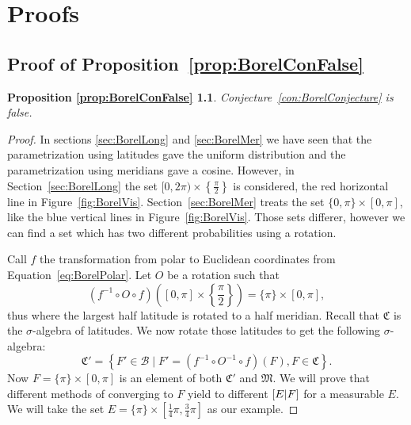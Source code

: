 \documentclass[a4paper]{report}
\theoremstyle{plain}
\newtheorem*{propositionBorelConFalse}{Proposition \ref{prop:BorelConFalse}}
\theoremstyle{definition}
\theoremstyle{remark}
\numberwithin{equation}{chapter}
\let\P\relax
\DeclareMathOperator{\P}{\mathbb{P}}
\DeclareMathOperator{\1}{\mathbbm{1}}
\newcommand{\B}{\mathcal{B}}
\begin{document}
\chapter{Proofs}
\section{Proof of Proposition~\ref{prop:BorelConFalse}}\label{app:ProofBorelConFalse}
\begin{propositionBorelConFalse}
Conjecture~\ref{con:BorelConjecture} is false.
\end{propositionBorelConFalse}
\begin{proof}

In sections \ref{sec:BorelLong} and \ref{sec:BorelMer} we have seen that the parametrization using latitudes gave the uniform distribution and the parametrization using meridians gave a cosine. However, in Section~\ref{sec:BorelLong} the set $[0,2\pi)\times\left\{\frac{\pi}{2}\right\}$ is considered, the red horizontal line in Figure~\ref{fig:BorelVis}. Section~\ref{sec:BorelMer} treats the set $\{0,\pi\}\times[0,\pi]$, like the blue vertical lines in Figure~\ref{fig:BorelVis}. Those sets differer, however we can find a set which has two different probabilities using a rotation.

Call $f$ the transformation from polar to Euclidean coordinates from Equation~\ref{eq:BorelPolar}. Let $O$ be a rotation such that
\begin{equation}
(f^{-1}\circ O\circ f)\left([0,\pi]\times\left\{\frac{\pi}{2}\right\}\right)=\{\pi\}\times[0,\pi],
\end{equation}
thus where the largest half latitude is rotated to a half meridian. Recall that $\mathfrak{C}$ is the $\sigma$-algebra of latitudes. We now rotate those latitudes to get the following $\sigma$-algebra:
\begin{equation}
\mathfrak{C}'=\left\{F'\in\B\mid F'=\left(f^{-1}\circ O^{-1}\circ f\right)(F),F\in\mathfrak{C}\right\}.
\end{equation}
Now $F=\{\pi\}\times[0,\pi]$ is an element of both $\mathfrak{C}'$ and $\mathfrak{M}$. We will prove that different methods of converging to $F$ yield to different $\P[E|F]$ for a measurable $E$. We will take the set $E=\{\pi\}\times\left[\frac{1}{4}\pi,\frac{3}{4}\pi\right]$ as our example.


\end{proof}
\end{document}
